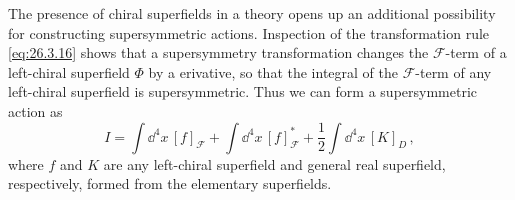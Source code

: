 The presence of chiral superfields in a theory opens up an additional
possibility for constructing supersymmetric actions. Inspection of the
transformation rule \eqref{eq:26.3.16} shows that a supersymmetry
transformation changes the $\mathcal{F}$-term of a left-chiral superfield
$\Phi$ by a \dd erivative, so that the integral of the $\mathcal{F}$-term of any
left-chiral superfield is supersymmetric. Thus we can form a supersymmetric
action as
\begin{equation}
  I=\int \dd^4x\,[f]_{\mathcal{F}}
  +\int \dd^4x\,[f]_{\mathcal{F}}^*
  +\frac12\int \dd^4x\,[K]_D\,,
  \tag{26.3.30}\label{eq:26.3.30}
\end{equation}
where $f$ and $K$ are any left-chiral superfield and general real superfield,
respectively, formed from the elementary superfields.


